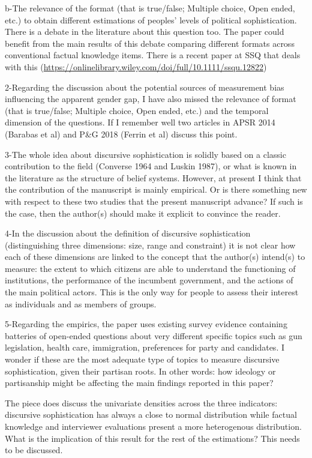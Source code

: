 b-The relevance of the format (that is true/false; Multiple choice, Open ended, etc.) to obtain different estimations of peoples' levels of political sophistication. There is a debate in the literature about this question too. The paper could benefit from the main results of this debate comparing different formats across conventional factual knowledge items. There is a recent paper at SSQ that deals with this (\url{https://onlinelibrary.wiley.com/doi/full/10.1111/ssqu.12822})

2-Regarding the discussion about the potential sources of measurement bias influencing the apparent gender gap, I have also missed the relevance of format (that is true/false; Multiple choice, Open ended, etc.) and the temporal dimension of the questions. If I remember well two articles in APSR 2014 (Barabas et al) and P\&G 2018 (Ferrin et al) discuss this point. 

3-The whole idea about discursive sophistication is solidly based on a classic contribution to the field (Converse 1964 and Luskin 1987), or what is known in the literature as the structure of belief systems. However, at present I think that the contribution of the manuscript is mainly empirical. Or is there something new with respect to these two studies that the present manuscript advance? If such is the case, then the author(s) should make it explicit to convince the reader.

4-In the discussion about the definition of discursive sophistication (distinguishing three dimensions: size, range and constraint) it is not clear how each of these dimensions are linked to the concept that the author(s) intend(s) to measure: the extent to which citizens are able to understand the functioning of institutions, the performance of the incumbent government, and the actions of the main political actors. This is the only way for people to assess their interest as individuals and as members of groups. 

5-Regarding the empirics, the paper uses existing survey evidence containing batteries of open-ended questions about very different specific topics such as gun legislation, health care, immigration, preferences for party and candidates. I wonder if these are the most adequate type of topics to measure discursive sophistication, given their partisan roots. In other words: how ideology or partisanship might be affecting the main findings reported in this paper? 

The piece does discuss the univariate densities across the three indicators: discursive sophistication has always a close to normal distribution while factual knowledge and interviewer evaluations present a more heterogenous distribution. What is the implication of this result for the rest of the estimations? This needs to be discussed.

